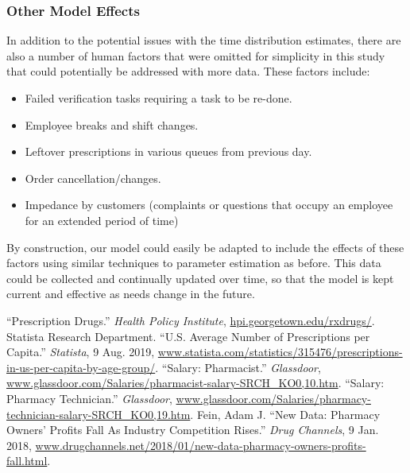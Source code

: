 \documentclass[10pt]{report}            %
\begin{document}
\subsubsection*{Other Model Effects}
In addition to the potential issues with the time distribution estimates, there are also a number of human factors that were omitted for simplicity in this study that could potentially be addressed with more data. These factors include:
\begin{itemize}
\item Failed verification tasks requiring a task to be re-done.
\item Employee breaks and shift changes.
\item Leftover prescriptions in various queues from previous day.
\item Order cancellation/changes.
\item Impedance by customers (complaints or questions that occupy an employee for an extended period of time)
\end{itemize}
By construction, our model could easily be adapted to include the effects of these factors using similar techniques to parameter estimation as before. This data could be collected and continually updated over time, so that the model is kept current and effective as needs change in the future.

\begin{thebibliography}{9}
 ``Prescription Drugs.” \textit{Health Policy Institute}, \url{hpi.georgetown.edu/rxdrugs/}.
 Statista Research Department. ``U.S. Average Number of Prescriptions per Capita.” \textit{Statista}, 9 Aug. 2019, \url{www.statista.com/statistics/315476/prescriptions-in-us-per-capita-by-age-group/}.
 ``Salary: Pharmacist.” \textit{Glassdoor}, \url{www.glassdoor.com/Salaries/pharmacist-salary-SRCH_KO0,10.htm}.
 ``Salary: Pharmacy Technician.” \textit{Glassdoor}, \url{www.glassdoor.com/Salaries/pharmacy-technician-salary-SRCH_KO0,19.htm}.
 Fein, Adam J. ``New Data: Pharmacy Owners' Profits Fall As Industry Competition Rises.” \textit{Drug Channels}, 9 Jan. 2018, \url{www.drugchannels.net/2018/01/new-data-pharmacy-owners-profits-fall.html}.
\end{thebibliography}
\end{document}
